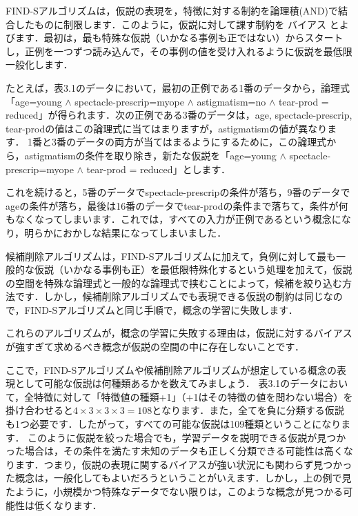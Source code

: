 FIND-Sアルゴリズムは，仮説の表現を，特徴に対する制約を論理積(AND)で結合したものに制限します．このように，仮説に対して課す制約を
バイアス
とよびます．最初は，最も特殊な仮説（いかなる事例も正ではない）からスタートし，正例を一つずつ読み込んで，その事例の値を受け入れるように仮説を最低限一般化します．

たとえば，表3.1のデータにおいて，最初の正例である1番のデータから，論理式「age=young $\wedge$ spectacle-prescrip=myope $\wedge$ astigmatism=no $\wedge$  tear-prod = reduced」が得られます．次の正例である3番のデータは，age, spectacle-prescrip, tear-prodの値はこの論理式に当てはまりますが，astigmatismの値が異なります．
1番と3番のデータの両方が当てはまるようにするために，この論理式から，astigmatismの条件を取り除き，新たな仮説を「age=young $\wedge$ spectacle-prescrip=myope $\wedge$ tear-prod = reduced」とします．

これを続けると，5番のデータでspectacle-prescripの条件が落ち，9番のデータでageの条件が落ち，最後は16番のデータでtear-prodの条件まで落ちて，条件が何もなくなってしまいます．これでは，すべての入力が正例であるという概念になり，明らかにおかしな結果になってしまいました．


候補削除アルゴリズムは，FIND-Sアルゴリズムに加えて，負例に対して最も一般的な仮説（いかなる事例も正）を最低限特殊化するという処理を加えて，仮説の空間を特殊な論理式と一般的な論理式で挟むことによって，候補を絞り込む方法です．しかし，候補削除アルゴリズムでも表現できる仮説の制約は同じなので，FIND-Sアルゴリズムと同じ手順で，概念の学習に失敗します．

これらのアルゴリズムが，概念の学習に失敗する理由は，仮説に対するバイアスが強すぎて求めるべき概念が仮説の空間の中に存在しないことです．


ここで，FIND-Sアルゴリズムや候補削除アルゴリズムが想定している概念の表現として可能な仮説は何種類あるかを数えてみましょう．
表3.1のデータにおいて，全特徴に対して「特徴値の種類+1」（+1はその特徴の値を問わない場合）を掛け合わせると$4 \times 3 \times 3 \times 3 = 108$となります．また，全てを負に分類する仮説も1つ必要です．したがって，すべての可能な仮説は109種類ということになります．
このように仮説を絞った場合でも，学習データを説明できる仮説が見つかった場合は，その条件を満たす未知のデータも正しく分類できる可能性は高くなります．つまり，仮説の表現に関するバイアスが強い状況にも関わらず見つかった概念は，一般化してもよいだろうということがいえます．しかし，上の例で見たように，小規模かつ特殊なデータでない限りは，このような概念が見つかる可能性は低くなります．

